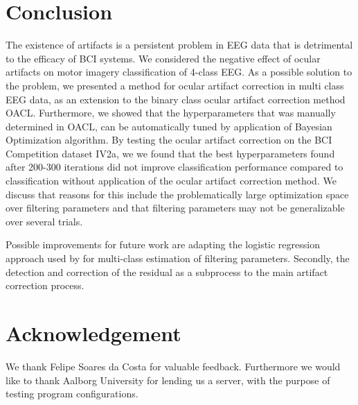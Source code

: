 \section{Conclusion}
The existence of artifacts is a persistent problem in EEG data that is detrimental to the efficacy of BCI systems. We considered the negative effect of ocular artifacts on motor imagery classification of 4-class EEG. As a possible solution to the problem, we presented a method for ocular artifact correction in multi class EEG data, as an extension to the binary class ocular artifact correction method OACL\citep{li2015ocular}. Furthermore, we showed that the hyperparameters that was manually determined in OACL, can be automatically tuned by application of Bayesian Optimization algorithm. By testing the ocular artifact correction on the BCI Competition dataset IV2a, we  we found that the best hyperparameters found after 200-300 iterations did not improve classification performance compared to classification without application of the ocular artifact correction method. We discuss that reasons for this include the problematically large optimization space over filtering parameters and that filtering parameters may not be generalizable over several trials.

Possible improvements for future work are adapting the logistic regression approach used by \citep{li2015ocular} for multi-class estimation of filtering parameters. Secondly, the detection and correction of the residual as a subprocess to the main artifact correction process. 

\section{Acknowledgement}
We thank Felipe Soares da Costa for valuable feedback. Furthermore we would like to thank Aalborg University for lending us a server, with the purpose of testing program configurations.  